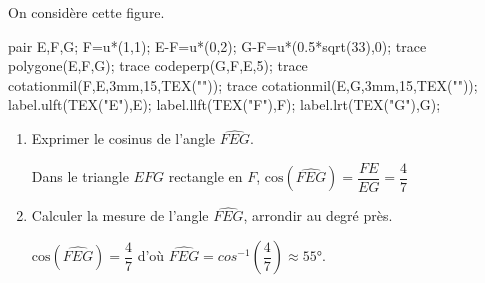     On considère cette figure.
    \begin{center}
        \begin{Geometrie}
            pair E,F,G;
            F=u*(1,1);
            E-F=u*(0,2);
            G-F=u*(0.5*sqrt(33),0);
            trace polygone(E,F,G);
            trace codeperp(G,F,E,5);
            trace cotationmil(F,E,3mm,15,TEX(""));
            trace cotationmil(E,G,3mm,15,TEX(""));
            label.ulft(TEX("E"),E);
            label.llft(TEX("F"),F);
            label.lrt(TEX("G"),G);
        \end{Geometrie}
    \end{center}
    \begin{enumerate}
        \item Exprimer le cosinus de l'angle $\widehat{FEG}$.

        {\color{red}Dans le triangle $EFG$ rectangle en $F$, $\text{cos}(\widehat{FEG})=\dfrac{FE}{EG}=\dfrac47$}
        \item Calculer la mesure de l'angle $\widehat{FEG}$, arrondir au degré près.

        {\color{red}$\text{cos}(\widehat{FEG})=\dfrac47$ d'où $\widehat{FEG}=cos^{-1}\left(\dfrac47\right)\approx\ang{55}$.}
    \end{enumerate}
